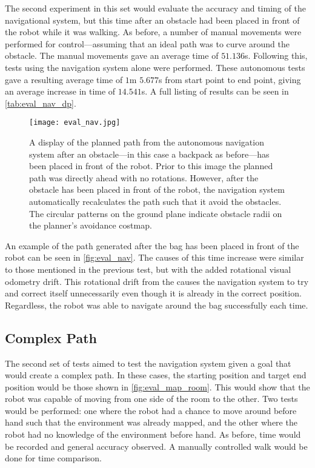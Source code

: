 The second experiment in this set would evaluate the accuracy and timing of the navigational system, but this time after an obstacle had been placed in front of the robot while it was walking. As before, a number of manual movements were performed for control---assuming that an ideal path was to curve around the obstacle. The manual movements gave an average time of $51.136$s. Following this, tests using the navigation system alone were performed. These autonomous tests gave a resulting average time of $1$m $5.677$s from start point to end point, giving an average increase in time of $14.541$s. A full listing of results can be seen in \autoref{tab:eval_nav_dp}.

\begin{figure}[h]
	\centering
	\texttt{[image: eval\_nav.jpg]}
	\caption{A display of the planned path from the autonomous navigation system after an obstacle---in this case a backpack as before---has been placed in front of the robot. Prior to this image the planned path was directly ahead with no rotations. However, after the obstacle has been placed in front of the robot, the navigation system automatically recalculates the path such that it avoid the obstacles. The circular patterns on the ground plane indicate obstacle radii on the planner's avoidance costmap.}
	\label{fig:eval_nav}
\end{figure}

An example of the path generated after the bag has been placed in front of the robot can be seen in \autoref{fig:eval_nav}. The causes of this time increase were similar to those mentioned in the previous test, but with the added rotational visual odometry drift. This rotational drift from the causes the navigation system to try and correct itself unnecessarily even though it is already in the correct position. Regardless, the robot was able to navigate around the bag successfully each time.

\subsection{Complex Path}

The second set of tests aimed to test the navigation system given a goal that would create a complex path. In these cases, the starting position and target end position would be those shown in \autoref{fig:eval_map_room}. This would show that the robot was capable of moving from one side of the room to the other. Two tests would be performed: one where the robot had a chance to move around before hand such that the environment was already mapped, and the other where the robot had no knowledge of the environment before hand. As before, time would be recorded and general accuracy observed. A manually controlled walk would be done for time comparison.

